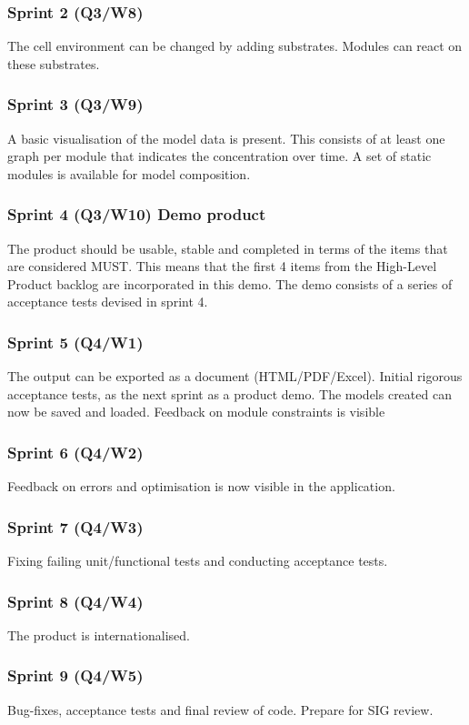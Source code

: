 \documentclass[10pt,a4paper]{report}
\begin{document}
			\subsubsection*{Sprint 2 (Q3/W8)}
				The cell environment can be changed by adding substrates. Modules can react on these substrates.
			\subsubsection*{Sprint 3 (Q3/W9)}
				A basic visualisation of the model data is present. This consists of at least one graph per module that indicates the concentration over time. A set of static modules is available for model composition.
			\subsubsection*{Sprint 4 (Q3/W10) Demo product}
				The product should be usable, stable and completed in terms of the items that are considered MUST. This means that the first 4 items from the High-Level Product backlog are incorporated in this demo. The demo consists of a series of acceptance tests devised in sprint 4.
			\subsubsection*{Sprint 5 (Q4/W1)}
				The output can be exported as a document (HTML/PDF/Excel). Initial rigorous acceptance tests, as the next sprint as a product demo. The models created can now be saved and loaded. Feedback on module constraints is visible
			\subsubsection*{Sprint 6 (Q4/W2)}
				Feedback on errors and optimisation is now visible in the application.
			\subsubsection*{Sprint 7 (Q4/W3)}
				Fixing failing unit/functional tests and conducting acceptance tests.\\
			\subsubsection*{Sprint 8 (Q4/W4)}
				The product is internationalised.
			\subsubsection*{Sprint 9 (Q4/W5)}
				Bug-fixes, acceptance tests and final review of code. Prepare for SIG review.
\end{document}
